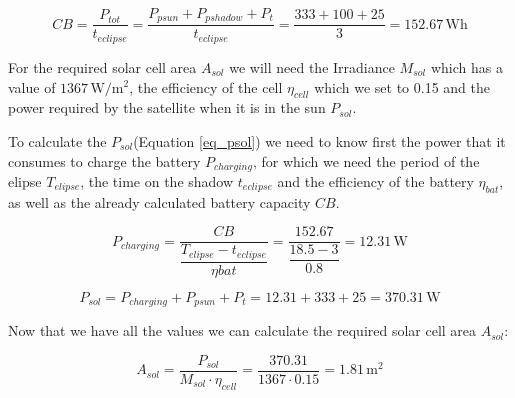 \documentclass[a4paper,12pt,calibri,oneside,openany]{book}
\newcommand{\unit}[1]{\ensuremath{\, \mathrm{#1}}}
\theoremstyle{break}
\begin{document}
		\begin{equation} \label{eq_cb}
			CB = \dfrac{P_{tot}}{t_{eclipse}} =
			\dfrac{P_{psun} +  P_{pshadow} + P_{t} }{t_{eclipse}}=
			\dfrac{333 +  100 + 25 } {3} = 152.67 \unit{Wh}
		\end{equation}
		
		For the required solar cell area $A_{sol}$ we will need the Irradiance $M_{sol}$ which has a value of $1367 \unit{W/m^{2}}$, the efficiency of the cell $\eta_{cell}$ which we set to 0.15 and the power required by the satellite when it is in the sun $P_{sol}$.
		
		To calculate the $P_{sol}$(Equation \ref{eq_psol}) we need to know first the power that it consumes to charge the battery $P_{charging}$, for which we need the period of the elipse $T_{elipse}$, the time on the shadow $t_{eclipse}$ and the efficiency of the battery $\eta_{bat}$, as well as the already calculated battery capacity $CB$.
		
		\begin{equation} \label{eq_pcharging}
			P_{charging} = \dfrac{CB}{\dfrac{T_{elipse}-t_{eclipse}} {\eta{bat}}	} =
			\dfrac{152.67}{\dfrac{18.5-3}{0.8}	} = 12.31 \unit{W}
		\end{equation}
		
		\begin{equation} \label{eq_psol}
			P_{sol} = P_{charging} + P_{psun} + P_{t}= 
			12.31 + 333 + 25= 370.31 \unit{W}
		\end{equation}
		
		Now that we have all the values we can calculate the required solar cell area $A_{sol}$:
		
		\begin{equation} \label{eq_asol}
			A_{sol} = \dfrac{P_{sol}}{M_{sol} \cdot \eta_{cell}}= \dfrac{370.31}{1367 \cdot 0.15}=  1.81 \unit{m^{2}}
		\end{equation}
		
	
	







	




%
\listoffigures
\end{document}
